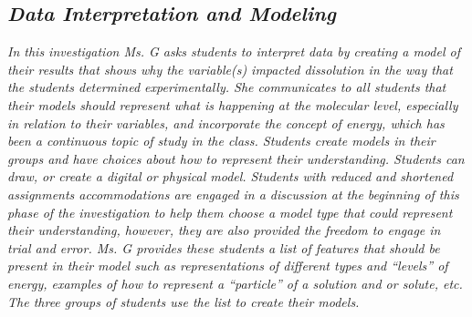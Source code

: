 \documentclass[11pt]{sig-alternate}
\begin{document}
\begin{large}
\subsection*{\textit{\textbf{Data Interpretation and Modeling}}}
\textit{In this investigation Ms. G asks students to interpret data by creating a model of their results that shows why the variable(s) impacted dissolution in the way that the students determined experimentally. She communicates to all students that their models should represent what is happening at the molecular level, especially in relation to their variables, and incorporate the concept of energy, which has been a continuous topic of study in the class. Students create models in their groups and have choices about how to represent their understanding. Students can draw, or create a digital or physical model. Students with reduced and shortened assignments accommodations are engaged in a discussion at the beginning of this phase of the investigation to help them choose a model type that could represent their understanding, however, they are also provided the freedom to engage in trial and error. Ms. G provides these students a list of features that should be present in their model such as representations of different types and “levels” of energy, examples of how to represent a “particle” of a solution and or solute, etc. The three groups of students use the list to create their models.}


\end{large}
\end{document}
